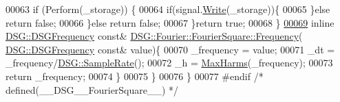 \begin{DoxyCode}
00063                 \textcolor{keywordflow}{if} (Perform(\_storage)) \{
00064                     \textcolor{keywordflow}{if}(signal.\hyperlink{class_d_s_g_1_1_ring_buffer_aa5dd2caa0a270173251faee40a43d692}{Write}(\_storage))\{
00065                     \}\textcolor{keywordflow}{else} \textcolor{keywordflow}{return} \textcolor{keyword}{false};
00066                 \}\textcolor{keywordflow}{else} \textcolor{keywordflow}{return} \textcolor{keyword}{false};
00067             \}\textcolor{keywordflow}{return} \textcolor{keyword}{true};
00068         \}
\hypertarget{_fourier_square_8h_source_l00069}{}\hyperlink{class_d_s_g_1_1_fourier_1_1_fourier_square_a120cbb563a518c9412190eaa36cb269f}{00069}         \textcolor{keyword}{inline} \hyperlink{namespace_d_s_g_a4315a061386fa1014fda09b15d3a6973}{DSG::DSGFrequency} \textcolor{keyword}{const}& 
      \hyperlink{class_d_s_g_1_1_phasor_a6bdec1d2722e2fa5c7173ac5f7adf682}{DSG::Fourier::FourierSquare::Frequency}(
      \hyperlink{namespace_d_s_g_a4315a061386fa1014fda09b15d3a6973}{DSG::DSGFrequency} \textcolor{keyword}{const}& value)\{
00070             \_frequency = value;
00071             \_dt = \_frequency/\hyperlink{namespace_d_s_g_a72df05177db0412c3590070923f62819}{DSG::SampleRate}();
00072             \_h = \hyperlink{namespace_d_s_g_ab5c4eea42ea10b69cfc32afb83ff1d0d}{MaxHarms}(\_frequency);
00073             \textcolor{keywordflow}{return} \_frequency;
00074         \}
00075     \}
00076 \}
00077 \textcolor{preprocessor}{#endif }\textcolor{comment}{/* defined(\_\_DSG\_\_FourierSquare\_\_) */}\textcolor{preprocessor}{}
\end{DoxyCode}
